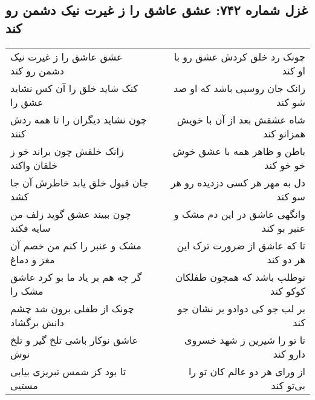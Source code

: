 \begin{center}
\section*{غزل شماره ۷۴۲: عشق عاشق را ز غیرت نیک دشمن رو کند}
\label{sec:0742}
\begin{longtable}{l p{0.5cm} r}
عشق عاشق را ز غیرت نیک دشمن رو کند
&&
چونک رد خلق کردش عشق رو با او کند
\\
کنک شاید خلق را آن کس نشاید عشق را
&&
زانک جان روسپی باشد که او صد شو کند
\\
چون نشاید دیگران را تا همه ردش کنند
&&
شاه عشقش بعد از آن با خویش همزانو کند
\\
زانک خلقش چون براند خو ز خلقان واکند
&&
باطن و ظاهر همه با عشق خوش خو خو کند
\\
جان قبول خلق یابد خاطرش آن جا کشد
&&
دل به مهر هر کسی دزدیده رو هر سو کند
\\
چون ببیند عشق گوید زلف من سایه فکند
&&
وانگهی عاشق در این دم مشک و عنبر بو کند
\\
مشک و عنبر را کنم من خصم آن مغز و دماغ
&&
تا که عاشق از ضرورت ترک این هر دو کند
\\
گر چه هم بر یاد ما بو کرد عاشق مشک را
&&
نوطلب باشد که همچون طفلکان کوکو کند
\\
چونک از طفلی برون شد چشم دانش برگشاد
&&
بر لب جو کی دوادو بر نشان جو کند
\\
عاشق نوکار باشی تلخ گیر و تلخ نوش
&&
تا تو را شیرین ز شهد خسروی دارو کند
\\
تا بود کز شمس تبریزی بیابی مستیی
&&
از ورای هر دو عالم کان تو را بی‌تو کند
\\
\end{longtable}
\end{center}
